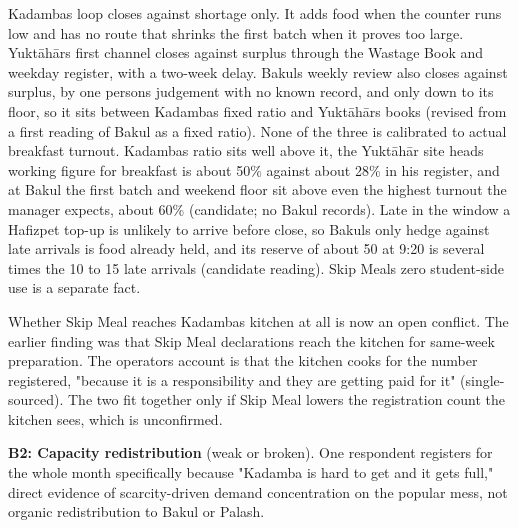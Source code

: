 \documentclass[
  10pt,
  table]{article}
\begin{document}
Kadamba\textquotesingle s loop closes against shortage only. It adds food when the counter runs low and has no route that shrinks the first batch when it proves too large. Yuktāhār\textquotesingle s first channel closes against surplus through the Wastage Book and weekday register, with a two-week delay. Bakul\textquotesingle s weekly review also closes against surplus, by one person\textquotesingle s judgement with no known record, and only down to its floor, so it sits between Kadamba\textquotesingle s fixed ratio and Yuktāhār\textquotesingle s books (revised from a first reading of Bakul as a fixed ratio). None of the three is calibrated to actual breakfast turnout. Kadamba\textquotesingle s ratio sits well above it, the Yuktāhār site head\textquotesingle s working figure for breakfast is about 50\% against about 28\% in his register, and at Bakul the first batch and weekend floor sit above even the highest turnout the manager expects, about 60\% (candidate; no Bakul records). Late in the window a Hafizpet top-up is unlikely to arrive before close, so Bakul\textquotesingle s only hedge against late arrivals is food already held, and its reserve of about 50 at 9:20 is several times the 10 to 15 late arrivals (candidate reading). Skip Meal\textquotesingle s zero student-side use is a separate fact.

Whether Skip Meal reaches Kadamba\textquotesingle s kitchen at all is now an open conflict. The earlier finding was that Skip Meal declarations reach the kitchen for same-week preparation. The operator\textquotesingle s account is that the kitchen cooks for the number registered, "because it is a responsibility and they are getting paid for it" (single-sourced). The two fit together only if Skip Meal lowers the registration count the kitchen sees, which is unconfirmed.

\textbf{B2: Capacity redistribution} (weak or broken). One respondent registers for the whole month specifically because "Kadamba is hard to get and it gets full," direct evidence of scarcity-driven demand concentration on the popular mess, not organic redistribution to Bakul or Palash.
\end{document}
